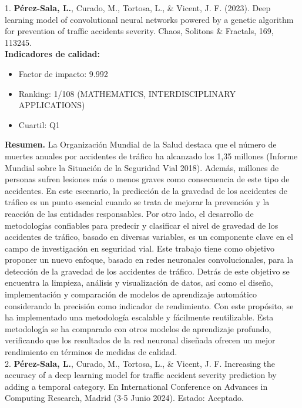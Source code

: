 \documentclass{uathesis-es}
\begin{document}
{1. \textbf{Pérez-Sala, L.}, Curado, M., Tortosa, L., \& Vicent, J. F. (2023). Deep learning model of convolutional neural networks powered by a genetic algorithm for prevention of traffic accidents severity. Chaos, Solitons \& Fractals, 169, 113245.\\

\textbf{Indicadores de calidad:} 
\begin{itemize}
    \item Factor de impacto: 9.992
    \item Ranking: 1/108 (MATHEMATICS, INTERDISCIPLINARY APPLICATIONS)
    \item Cuartil: Q1
\end{itemize}

\textbf{Resumen.} La Organización Mundial de la Salud destaca que el número de muertes anuales por accidentes de tráfico ha alcanzado los 1,35 millones (Informe Mundial sobre la Situación de la Seguridad Vial 2018). Además, millones de personas sufren lesiones más o menos graves como consecuencia de este tipo de accidentes. En este escenario, la predicción de la gravedad de los accidentes de tráfico es un punto esencial cuando se trata de mejorar la prevención y la reacción de las entidades responsables. Por otro lado, el desarrollo de metodologías confiables para predecir y clasificar el nivel de gravedad de los accidentes de tráfico, basado en diversas variables, es un componente clave en el campo de investigación en seguridad vial. Este trabajo tiene como objetivo proponer un nuevo enfoque, basado en redes neuronales convolucionales, para la detección de la gravedad de los accidentes de tráfico. Detrás de este objetivo se encuentra la limpieza, análisis y visualización de datos, así como el diseño, implementación y comparación de modelos de aprendizaje automático considerando la precisión como indicador de rendimiento.
Con este propósito, se ha implementado una metodología escalable y fácilmente reutilizable. Esta metodología se ha comparado con otros modelos de aprendizaje profundo, verificando que los resultados de la red neuronal diseñada ofrecen un mejor rendimiento en términos de medidas de calidad.\\


2. \textbf{Pérez-Sala, L.}, Curado, M., Tortosa, L., \& Vicent, J. F. Increasing the accuracy of a deep learning model for traffic accident severity prediction by adding a temporal category. En International Conference on Advances in Computing Research, Madrid (3-5 Junio 2024). Estado: Aceptado.\\

}
\end{document}
